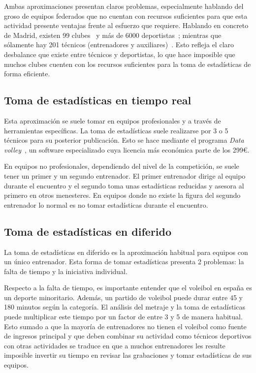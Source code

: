 \documentclass[12pt]{report} %
\begin{document}
    Ambas aproximaciones presentan claros problemas, especialmente hablando del
    groso de equipos federados que no cuentan con recursos suficientes para que
    esta actividad presente ventajas frente al esfuerzo que requiere. Hablando
    en concreto de Madrid, existen 99 clubes~\cite{directorio-clubes} y más de
    6000 deportistas~\cite{estadisticasFEVB}; mientras que sólamente hay
    201 técnicos (entrenadores y auxiliares)~\cite{estadisticasFEVB}. Esto
    refleja el claro desbalance que existe entre técnicos y deportistas, lo que
    hace imposible que muchos clubes cuenten con los recursos suficientes para
    la toma de estadísticas de forma eficiente.

    \subsection{Toma de estadísticas en tiempo real}
    
    Esta aproximación se suele tomar en equipos profesionales y a través de
    herramientas específicas. La toma de estadísticas suele realizarse por 3 o
    5 técnicos para su posterior publicación. Esto se hace mediante el programa
    \textit{Data volley}~\cite{datavoley}, un software especializado cuya
    licencia más económica parte de los 299\euro. 

    En equipos no profesionales, dependiendo del nivel de la competición, se
    suele tener un primer y un segundo entrenador. El primer entrenador dirige
    al equipo durante el encuentro y el segundo toma unas estadísticas
    reducidas y asesora al primero en otros menesteres. En equipos donde no
    existe la figura del segundo entrenador lo normal es no tomar estadísticas
    durante el encuentro.

    \subsection{Toma de estadísticas en diferido}

    La toma de estadísticas en diferido es la aproximación habitual para
    equipos con un único entrenador. Esta forma de tomar estadísticas presenta
    2 problemas: la falta de tiempo y la iniciativa individual.

    Respecto a la falta de tiempo, es importante entender que el voleibol en
    españa es un deporte minoritario. Además, un partido de voleibol puede durar
    entre 45 y 180 minutos según la categoría. El análisis del metraje y la
    toma de estadísticas puede multiplicar este tiempo por un factor de entre 3
    y 5 de manera habitual. Esto sumado a que la mayoría de entrenadores no
    tienen el voleibol como fuente de ingresos principal y que deben combinar
    su actividad como técnicos deportivos con otras actividades se
    traduce en que a muchos entrenadores les resulte imposible invertir su
    tiempo en revisar las grabaciones y tomar estadísticas de sus equipos.
\end{document}
